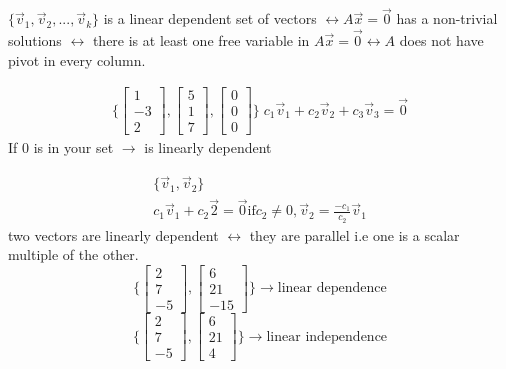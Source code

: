 \documentclass[11pt]{article} %
\begin{document}
$\{ \vec{v}_1, \vec{v}_2, ..., \vec{v}_k\}$ is a linear dependent set of vectors $\longleftrightarrow A\vec{x} = \vec{0}$ has a non-trivial solutions $\longleftrightarrow$ there is at least one free variable in $A\vec{x} = \vec{0} \longleftrightarrow A$ does not have pivot in every column.

\begin{gather*}
\{\begin{bmatrix}
1\\-3\\2
\end{bmatrix}, \begin{bmatrix}
5\\1\\7
\end{bmatrix}, \begin{bmatrix}
0\\0\\0
\end{bmatrix}
\} \; c_1\vec{v}_1 + c_2\vec{v}_2 + c_3\vec{v}_3 = \vec{0}
\end{gather*}
If 0 is in your set $\rightarrow$ is linearly dependent


\begin{gather*}
\{ \vec{v}_1, \vec{v}_2\} \\
c_1\vec{v}_1 + c_2\vec{2} = \vec{0}
\text{if} c_2 \neq 0, \vec{v}_2 = \frac{-c_1}{c_2}\vec{v}_1
\end{gather*}
two vectors are linearly dependent $\longleftrightarrow$ they are parallel i.e one is a scalar multiple of the other.
\begin{equation}
\{\begin{bmatrix}
2\\7\\-5
\end{bmatrix}, \begin{bmatrix}
6\\21\\-15
\end{bmatrix}\} \rightarrow \text{linear dependence}
\end{equation}
\begin{equation}
\{\begin{bmatrix}
2\\7\\-5
\end{bmatrix}, \begin{bmatrix}
6\\21\\4
\end{bmatrix}\} \rightarrow \text{linear independence}
\end{equation}


\end{document}
